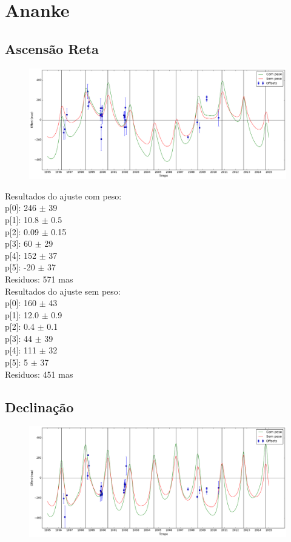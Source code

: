 \documentclass[11pt,a4paper]{report}
\author{Altair Ramos}
\begin{document}
\chapter*{Ananke}
\section*{Ascensão Reta}
\begin{figure}[h]
\includegraphics[scale=0.35]{Ananke/RA.png} 
\end{figure}

\indent Resultados do ajuste com peso:\\
p[0]: 246 $\pm$ 39\\
p[1]: 10.8 $\pm$ 0.5\\
p[2]: 0.09 $\pm$ 0.15\\
p[3]: 60 $\pm$ 29\\
p[4]: 152 $\pm$ 37\\
p[5]: -20 $\pm$ 37\\
Residuos: 571 mas\\

Resultados do ajuste sem peso:\\
p[0]: 160 $\pm$ 43\\
p[1]: 12.0 $\pm$ 0.9\\
p[2]: 0.4 $\pm$ 0.1\\
p[3]: 44 $\pm$ 39\\
p[4]: 111 $\pm$ 32\\
p[5]: 5 $\pm$ 37\\
Residuos: 451 mas\\

\section*{Declinação}

\begin{figure}[h]
\includegraphics[scale=0.35]{Ananke/DEC.png} 
\end{figure}
\end{document}
